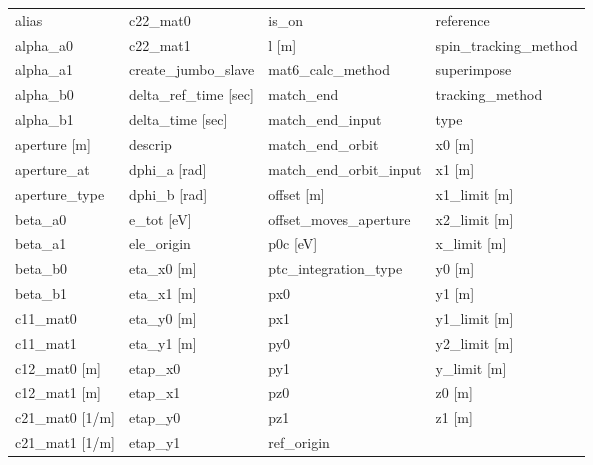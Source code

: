  \begin{tabular}{llll} \toprule
alias                          & c22_mat0                       & is_on                          & reference                      \\
alpha_a0                       & c22_mat1                       & l [m]                          & spin_tracking_method           \\
alpha_a1                       & create_jumbo_slave             & mat6_calc_method               & superimpose                    \\
alpha_b0                       & delta_ref_time [sec]           & match_end                      & tracking_method                \\
alpha_b1                       & delta_time [sec]               & match_end_input                & type                           \\
aperture [m]                   & descrip                        & match_end_orbit                & x0 [m]                         \\
aperture_at                    & dphi_a [rad]                   & match_end_orbit_input          & x1 [m]                         \\
aperture_type                  & dphi_b [rad]                   & offset [m]                     & x1_limit [m]                   \\
beta_a0                        & e_tot [eV]                     & offset_moves_aperture          & x2_limit [m]                   \\
beta_a1                        & ele_origin                     & p0c [eV]                       & x_limit [m]                    \\
beta_b0                        & eta_x0 [m]                     & ptc_integration_type           & y0 [m]                         \\
beta_b1                        & eta_x1 [m]                     & px0                            & y1 [m]                         \\
c11_mat0                       & eta_y0 [m]                     & px1                            & y1_limit [m]                   \\
c11_mat1                       & eta_y1 [m]                     & py0                            & y2_limit [m]                   \\
c12_mat0 [m]                   & etap_x0                        & py1                            & y_limit [m]                    \\
c12_mat1 [m]                   & etap_x1                        & pz0                            & z0 [m]                         \\
c21_mat0 [1/m]                 & etap_y0                        & pz1                            & z1 [m]                         \\
c21_mat1 [1/m]                 & etap_y1                        & ref_origin                     &                                \\
 \bottomrule
 \end{tabular}
 \vfill
 
